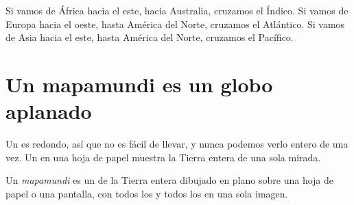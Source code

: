 \begin{example}\label{ex:g3:continents-and-oceans:africa-australia}
Si vamos de África hacia el este, hacia Australia, cruzamos el 
Índico. Si vamos de Europa hacia el oeste, hasta América del Norte, cruzamos
el  Atlántico. Si vamos de Asia hacia el este, hasta América del
Norte, cruzamos el  Pacífico.
\end{example}

\section{Un mapamundi es un globo aplanado}

Un  es redondo, así que no es fácil de llevar, y nunca
podemos verlo entero de una vez. Un  en una hoja de papel muestra la
Tierra entera de una sola mirada.

\begin{definition}[Mapamundi]\label{def:g3:continents-and-oceans:world-map}
Un \emph{mapamundi} es un  de la Tierra entera dibujado
en plano sobre una hoja de papel o una pantalla, con todos los 
y todos los  en una sola imagen.
\end{definition}

